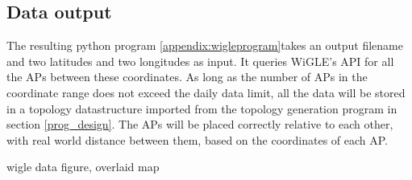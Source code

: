 \subsection{Data output}
The resulting python program \ref{appendix:wigleprogram}takes an output filename and two latitudes and two longitudes as input. It queries WiGLE's API for all the APs between these coordinates.
As long as the number of APs in the coordinate range does not exceed the daily data limit, all the data will be stored in a topology datastructure imported 
from the topology generation program in section \ref{prog_design}. The APs will be placed correctly relative to each other, with real world distance between them,
based on the coordinates of each AP. 

{{wigle data figure, overlaid map}}

